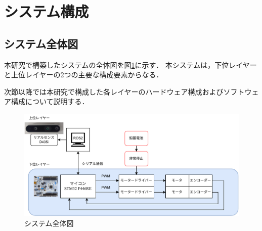 \section{システム構成}
\subsection{システム全体図}
本研究で構築したシステムの全体図を図\ref{fig:system_diagram}に示す．
本システムは，下位レイヤーと上位レイヤーの2つの主要な構成要素からなる．

次節以降では本研究で構成した各レイヤーのハードウェア構成およびソフトウェア構成について説明する．

\begin{figure}[h]
    \centering
    \includegraphics[width=1.0\textwidth]{figure/system.pdf}
    \caption{システム全体図}
    \label{fig:system_diagram}
\end{figure}


